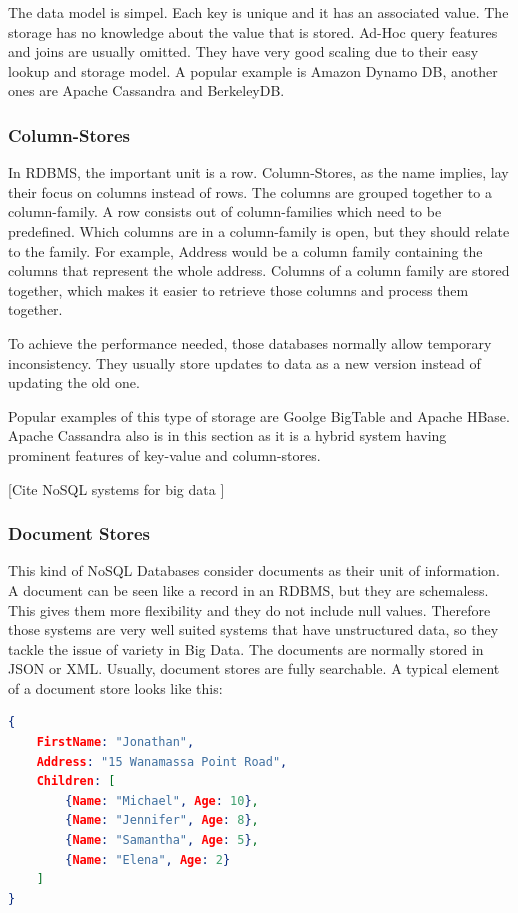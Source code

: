 \documentclass{acm_proc_article-sp}
\begin{document}
The data model is simpel. Each key is unique and it has an associated value. The storage has no knowledge about the value that is stored. Ad-Hoc query features and joins are usually omitted. They have very good scaling due to their easy lookup and storage model. A popular example is Amazon Dynamo DB, another ones are Apache Cassandra and BerkeleyDB.
	
\subsubsection{Column-Stores}

In RDBMS, the important unit is a row. Column-Stores, as the name implies, lay their focus on columns instead of rows. The columns are grouped together to a column-family. A row consists out of column-families which need to be predefined. Which columns are in a column-family is open, but they should relate to the family. For example, Address would be a column family containing the columns that represent the whole address. Columns of a column family are stored together, which makes it easier to retrieve those columns and process them together.

To achieve the performance needed, those databases normally allow temporary inconsistency. They usually store updates to data as a new version instead of updating the old one.

Popular examples of this type of storage are Goolge BigTable and Apache HBase. Apache Cassandra also is in this section as it is a hybrid system having prominent features of key-value and column-stores.

[Cite NoSQL systems for big data ]

\subsubsection{Document Stores}

This kind of NoSQL Databases consider documents as their unit of information. A
document can be seen like a record in an RDBMS, but they are schemaless. This
gives them more flexibility and they do not include null values. Therefore those systems are very well suited systems that have unstructured data, so they tackle the issue of variety in Big Data.
The documents are normally stored in JSON or XML. Usually, document stores are fully searchable. A typical element of a document store looks
like this:

\begin{lstlisting}[language=json,firstnumber=1]
{
	FirstName: "Jonathan",
	Address: "15 Wanamassa Point Road",
	Children: [
		{Name: "Michael", Age: 10},
		{Name: "Jennifer", Age: 8},
		{Name: "Samantha", Age: 5},
		{Name: "Elena", Age: 2}
	]
}
\end{lstlisting}
\end{document}

